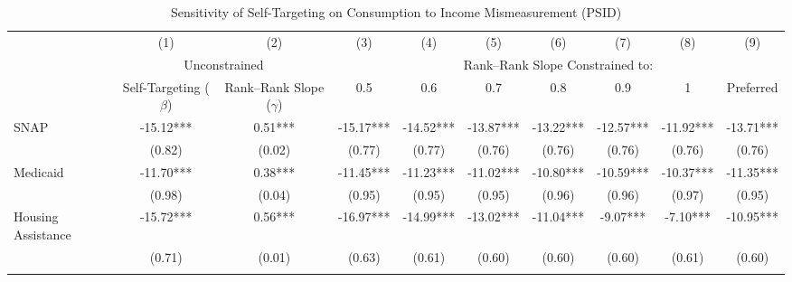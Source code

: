 \begin{table}[]     \footnotesize     \centering
\caption{Sensitivity of Self-Targeting on Consumption to Income Mismeasurement (PSID)}
\label{tab:constrained_reg_c}
\begin{tabular*}{1.36\textwidth}{@{\extracolsep{\fill}}lccccccccc}
\toprule
                   & (1)                               & (2)                               & (3)                             & (4)                             & (5)                             & (6)                             & (7)                             & (8)                             & (9) \\
                   & \multicolumn{2}{c}{Unconstrained} & \multicolumn{7}{c}{Rank--Rank Slope Constrained to:} \\
\cmidrule{2-3}\cmidrule{4-10}
                   & Self-Targeting ($\beta$)          & Rank--Rank Slope ($\gamma$)       & 0.5                             & 0.6                             & 0.7                             & 0.8                             & 0.9                             & 1                               & Preferred \\
\midrule
\addlinespace
SNAP               & -15.12***        & 0.51***        & -15.17***        & -14.52***        & -13.87***        & -13.22***        & -12.57***        & -11.92***        & -13.71*** \\
                   & (0.82)            & (0.02)            & (0.77)            & (0.77)            & (0.76)            & (0.76)            & (0.76)            & (0.76)            & (0.76)     \\
\addlinespace
Medicaid           & -11.70***    & 0.38***    & -11.45***    & -11.23***    & -11.02***    & -10.80***    & -10.59***    & -10.37***    & -11.35*** \\
                   & (0.98)        & (0.04)        & (0.95)        & (0.95)        & (0.95)        & (0.96)        & (0.96)        & (0.97)        & (0.95)     \\
\addlinespace
Housing Assistance & -15.72***          & 0.56***          & -16.97***          & -14.99***          & -13.02***          & -11.04***          & -9.07***          & -7.10***          & -10.95*** \\
                   & (0.71)              & (0.01)              & (0.63)              & (0.61)              & (0.60)              & (0.60)              & (0.60)              & (0.61)              & (0.60)     \\
\addlinespace

\end{tabular*}
\end{table}
